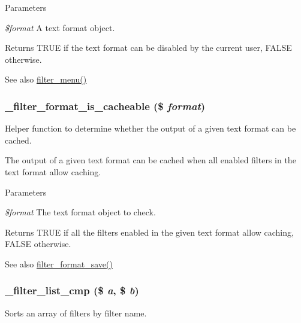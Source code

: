 \begin{DoxyParams}{Parameters}
\item[{\em \$format}]A text format object.\end{DoxyParams}
\begin{DoxyReturn}{Returns}
TRUE if the text format can be disabled by the current user, FALSE otherwise.
\end{DoxyReturn}
\begin{DoxySeeAlso}{See also}
\hyperlink{filter_8module_a13c5612763d7d98499832594ac3d5466}{filter\_\-menu()} 
\end{DoxySeeAlso}
\hypertarget{filter_8module_aab4f5d65547268e4dd302b7bcc6b7c83}{
\subsubsection[{\_\-filter\_\-format\_\-is\_\-cacheable}]{\setlength{\rightskip}{0pt plus 5cm}\_\-filter\_\-format\_\-is\_\-cacheable (\$ {\em format})}}
\label{filter_8module_aab4f5d65547268e4dd302b7bcc6b7c83}
Helper function to determine whether the output of a given text format can be cached.

The output of a given text format can be cached when all enabled filters in the text format allow caching.


\begin{DoxyParams}{Parameters}
\item[{\em \$format}]The text format object to check.\end{DoxyParams}
\begin{DoxyReturn}{Returns}
TRUE if all the filters enabled in the given text format allow caching, FALSE otherwise.
\end{DoxyReturn}
\begin{DoxySeeAlso}{See also}
\hyperlink{filter_8module_a3522ef59e8cc0abe0a448cb92b0d9212}{filter\_\-format\_\-save()} 
\end{DoxySeeAlso}
\hypertarget{filter_8module_afa289405136953ef594285021955f7e7}{
\subsubsection[{\_\-filter\_\-list\_\-cmp}]{\setlength{\rightskip}{0pt plus 5cm}\_\-filter\_\-list\_\-cmp (\$ {\em a}, \/  \$ {\em b})}}
\label{filter_8module_afa289405136953ef594285021955f7e7}
Sorts an array of filters by filter name.

